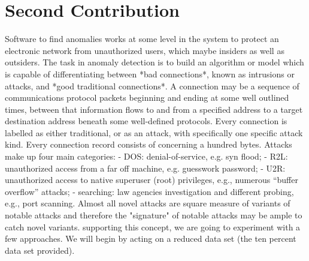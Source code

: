 \chapter{Second Contribution}
\label{chap:chapter4}
Software to find anomalies works at some level in the system to protect an electronic network from unauthorized users, which maybe insiders as well as outsiders. The task in anomaly detection is to build an algorithm or model which is capable of differentiating between *bad connections*, known as intrusions or attacks, and *good traditional connections*.\newline
A connection may be a sequence of communications protocol packets beginning and ending at some well outlined times, between that information flows to and from a specified address to a target destination address beneath some well-defined protocols. Every connection is labelled as either traditional, or as an attack, with specifically one specific attack kind. Every connection record consists of concerning a hundred bytes.\newline \newline
Attacks make up four main categories: \newline
- DOS: denial-of-service, e.g. syn flood;\newline 
- R2L: unauthorized access from a far off machine, e.g. guesswork password;\newline 
- U2R: unauthorized access to native superuser (root) privileges, e.g., numerous ``buffer overflow'' attacks; \newline
- searching: law agencies investigation and different probing, e.g., port scanning.\newline
\newline
\newline
Almost all novel attacks are square measure of variants of notable attacks and therefore the "signature" of notable attacks may be ample to catch novel variants. supporting this concept, we are going to experiment with a few approaches. We will begin by acting on a reduced data set (the ten percent data set provided). \newline\newline

